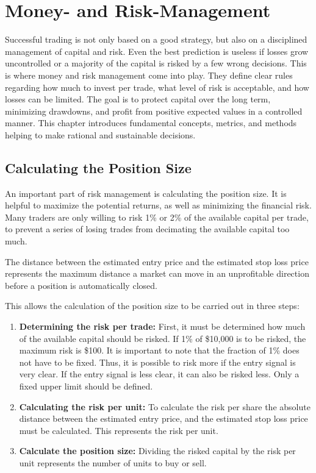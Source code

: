 \section{Money- and Risk-Management}

Successful trading is not only based on a good strategy, but also on a disciplined management of capital and risk.
Even the best prediction is useless if losses grow uncontrolled or a majority of the capital is risked by a few wrong decisions.
This is where money and risk management come into play.
They define clear rules regarding how much to invest per trade, what level of risk is acceptable, and how losses can be limited.
The goal is to protect capital over the long term, minimizing drawdowns, and profit from positive expected values in a controlled manner.
This chapter introduces fundamental concepts, metrics, and methods helping to make rational and sustainable decisions.

\subsection{Calculating the Position Size}

An important part of risk management is calculating the position size.
It is helpful to maximize the potential returns, as well as minimizing the financial risk.
Many traders are only willing to risk 1\% or 2\% of the available capital per trade, to prevent a series of losing trades from decimating the available capital too much.

The distance between the estimated entry price and the estimated stop loss price represents the maximum distance a market can move in an unprofitable direction before a position is automatically closed.

This allows the calculation of the position size to be carried out in three steps:

\begin{enumerate}
    \item \textbf{Determining the risk per trade:} First, it must be determined how much of the available capital should be risked.
    If 1\% of \$10,000 is to be risked, the maximum risk is \$100.
    It is important to note that the fraction of 1\% does not have to be fixed.
    Thus, it is possible to risk more if the entry signal is very clear.
    If the entry signal is less clear, it can also be risked less.
    Only a fixed upper limit should be defined.
    \item \textbf{Calculating the risk per unit:} To calculate the risk per share the absolute distance between the estimated entry price, and the estimated stop loss price must be calculated.
    This represents the risk per unit.
    \item \textbf{Calculate the position size:} Dividing the risked capital by the risk per unit represents the number of units to buy or sell.
\end{enumerate}

